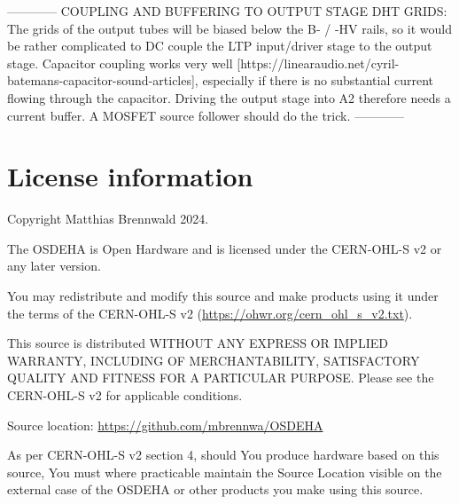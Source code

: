 ------------
COUPLING AND BUFFERING TO OUTPUT STAGE DHT GRIDS: The grids of the output tubes will be biased below the B- / -HV rails, so it would be rather complicated to DC couple the LTP input/driver stage to the output stage. Capacitor coupling works very well [https://linearaudio.net/cyril-batemans-capacitor-sound-articles], especially if there is no substantial current flowing through the capacitor. Driving the output stage into A2 therefore needs a current buffer. A MOSFET source follower should do the trick.
------------





\section{License information} 
Copyright Matthias Brennwald 2024.                                                    

The OSDEHA is Open Hardware and is licensed under the CERN-OHL-S v2 or any later version.

You may redistribute and modify this source and make products using it under the terms of the CERN-OHL-S v2 (\url{https://ohwr.org/cern_ohl_s_v2.txt}).

This source is distributed WITHOUT ANY EXPRESS OR IMPLIED WARRANTY, INCLUDING OF MERCHANTABILITY, SATISFACTORY QUALITY AND FITNESS FOR A PARTICULAR PURPOSE. Please see the CERN-OHL-S v2 for applicable conditions.

Source location: \url{https://github.com/mbrennwa/OSDEHA}

As per CERN-OHL-S v2 section 4, should You produce hardware based on this source, You must where practicable maintain the Source Location visible on the external case of the OSDEHA or other products you make using this source.            






